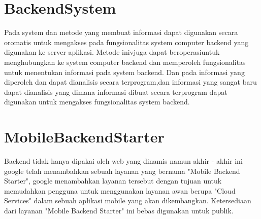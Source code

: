 \section{BackendSystem}
Pada system dan metode  yang membuat informasi dapat digunakan secara oromatis untuk mengakses pada fungsionalitas system computer backend yang digunakan ke server aplikasi. Metode inivjuga dapat beroperasiuntuk menghubungkan ke system computer backend dan memperoleh fungsionalitas untuk menentukan informasi  pada system backend. Dan pada informasi yang diperoleh dan dapat dianalisis secara terprogram,dan informasi yang sangat baru dapat dianalisis yang dimana informasi dibuat secara terprogram dapat digunakan untuk mengakses fungsionalitas system backend.

\section{MobileBackendStarter}
Backend tidak hanya dipakai oleh web yang dinamis namun akhir - akhir ini google telah menambahkan sebuah layanan yang bernama
"Mobile Backend Starter", google menambahkan layanan tersebut dengan tujuan untuk memudahkan pengguna untuk menggunakan
layanan awan berupa "Cloud Services" dalam sebuah aplikasi mobile yang akan dikembangkan. Ketersediaan dari layanan "Mobile Backend Starter" ini bebas digunakan untuk publik.




		

